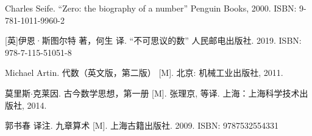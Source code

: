 Charles Seife. ``Zero: the biography of a number'' Penguin Books, 2000. ISBN: 9-781-1011-9960-2

[英]伊恩·斯图尔特 著，何生 译. ``不可思议的数'' 人民邮电出版社. 2019. ISBN: 978-7-115-51051-8

Michael Artin. 代数（英文版，第二版） [M]. 北京: 机械工业出版社, 2011. %

莫里斯$\cdot$克莱因. 古今数学思想，第一册 [M]. 张理京, 等译. 上海：上海科学技术出版社, 2014. %

郭书春 译注. 九章算术 [M]. 上海古籍出版社. 2009. ISBN: 9787532554331
